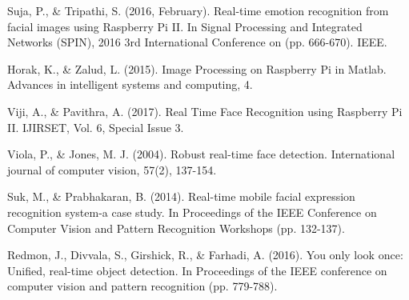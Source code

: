 \cleardoublepage
{}
{}
\begin{thebibliography}{99}

Suja, P., \& Tripathi, S. (2016, February). Real-time emotion recognition from facial images using Raspberry Pi II. In Signal Processing and Integrated Networks (SPIN), 2016 3rd International Conference on (pp. 666-670). IEEE.

Horak, K., \& Zalud, L. (2015). Image Processing on Raspberry Pi in Matlab. Advances in intelligent systems and computing, 4.

Viji, A., \& Pavithra, A. (2017). Real Time Face Recognition using Raspberry Pi II. IJIRSET, Vol. 6, Special Issue 3.

Viola, P., \& Jones, M. J. (2004). Robust real-time face detection. International journal of computer vision, 57(2), 137-154.

Suk, M., \& Prabhakaran, B. (2014). Real-time mobile facial expression recognition system-a case study. In Proceedings of the IEEE Conference on Computer Vision and Pattern Recognition Workshops (pp. 132-137).

Redmon, J., Divvala, S., Girshick, R., \& Farhadi, A. (2016). You only look once: Unified, real-time object detection. In Proceedings of the IEEE conference on computer vision and pattern recognition (pp. 779-788).

\end{thebibliography}